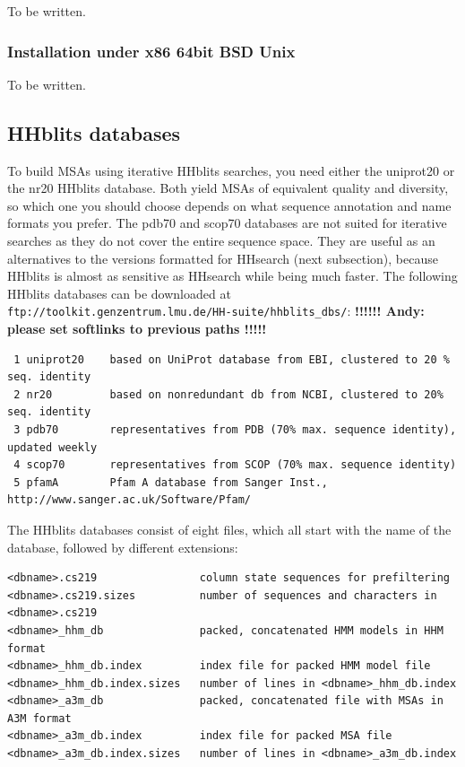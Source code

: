 \documentclass[11pt,a4paper]{article}
\begin{document}
To be written.


\subsubsection*{Installation under x86 64bit BSD Unix}

To be written.



\subsection{HHblits databases} \label{hhblits_dbs}
To build MSAs using iterative HHblits searches, you need either the uniprot20 or the nr20 HHblits database. Both yield MSAs of equivalent quality and diversity, so which one you should choose depends on what sequence annotation and name formats you prefer. The pdb70 and scop70 databases are not suited for iterative searches as they do not cover the entire sequence space. They are useful as an alternatives to the versions formatted for HHsearch (next subsection), because HHblits is almost as sensitive as HHsearch while being much faster. The following HHblits databases can be downloaded at 
\verb`ftp://toolkit.genzentrum.lmu.de/HH-suite/hhblits_dbs/`: 
{\bf  !!!!!! Andy: please set softlinks to previous paths !!!!! }

\small 
\begin{verbatim}
 1 uniprot20    based on UniProt database from EBI, clustered to 20 % seq. identity
 2 nr20         based on nonredundant db from NCBI, clustered to 20% seq. identity
 3 pdb70        representatives from PDB (70% max. sequence identity), updated weekly
 4 scop70       representatives from SCOP (70% max. sequence identity)
 5 pfamA        Pfam A database from Sanger Inst., http://www.sanger.ac.uk/Software/Pfam/
\end{verbatim} 
\normalsize

The HHblits databases consist of eight files, which all start with the name of the database, followed by different extensions:
\begin{verbatim}
<dbname>.cs219                column state sequences for prefiltering
<dbname>.cs219.sizes          number of sequences and characters in <dbname>.cs219  
<dbname>_hhm_db               packed, concatenated HMM models in HHM format
<dbname>_hhm_db.index         index file for packed HMM model file
<dbname>_hhm_db.index.sizes   number of lines in <dbname>_hhm_db.index
<dbname>_a3m_db               packed, concatenated file with MSAs in A3M format
<dbname>_a3m_db.index         index file for packed MSA file
<dbname>_a3m_db.index.sizes   number of lines in <dbname>_a3m_db.index
\end{verbatim}
\end{document}
